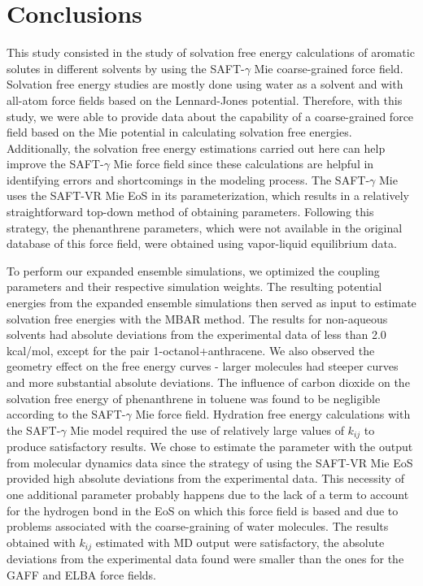 \documentclass[final,12p,times,twocolumn]{elsarticle}
\begin{document}
	\section{Conclusions}
	This study consisted in the study of solvation free energy calculations of aromatic solutes in different solvents by using the SAFT-$\gamma$ Mie coarse-grained force field. Solvation free energy studies are mostly done using water as a solvent and with all-atom force fields based on the Lennard-Jones potential. Therefore, with this study, we were able to provide data about the capability of a coarse-grained force field based on the Mie potential in calculating solvation free energies. Additionally, the solvation free energy estimations carried out here can help improve the SAFT-$\gamma$  Mie force field since these calculations are helpful in identifying errors and shortcomings in the modeling process. The SAFT-$\gamma$ Mie uses the SAFT-VR Mie EoS in its parameterization, which results in a relatively straightforward top-down method of obtaining parameters. Following this strategy, the phenanthrene parameters, which were not available in the original database of this force field, were obtained using vapor-liquid equilibrium data.
	
	To perform our expanded ensemble simulations, we optimized the coupling parameters and their respective simulation weights. The resulting potential energies from the expanded ensemble simulations then served as input to estimate solvation free energies with the MBAR method. The results for non-aqueous solvents had absolute deviations from the experimental
	data of less than 2.0 kcal/mol, except for the pair 1-octanol+anthracene. We also observed the geometry effect on the free energy curves - larger molecules had steeper curves and more substantial absolute deviations. The influence of carbon dioxide on the solvation free energy of phenanthrene in toluene was found to be negligible according to the SAFT-$\gamma$ Mie force field. Hydration free energy calculations with the SAFT-$\gamma$ Mie model required the use of relatively large values of $k_{ij}$ to produce satisfactory results. We chose to estimate the parameter with the output from molecular dynamics data since the strategy of using the SAFT-VR Mie EoS provided high absolute deviations from the experimental data. This necessity of one additional parameter probably happens due to the lack of a term to account for the hydrogen bond in the EoS on which this force field is based and due to problems associated with the coarse-graining of water molecules. The results obtained with $k_{ij}$ estimated with MD output were satisfactory, the absolute deviations from the experimental data found were smaller than the ones for the GAFF and ELBA force fields.
	
\end{document}
